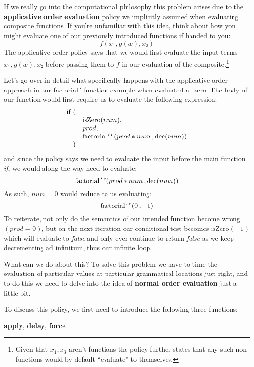 \documentclass[twoside]{article}
\newcommand{\supst}[1]{\ensuremath{^{\mbox{\scriptsize #1}}}}
\newcommand{\strong}[1]{{\bfseries #1}}
\begin{document}
If we really go into the computational philosophy this problem arises due to the \strong{applicative order evaluation}
policy we implicitly assumed when evaluating composite functions. If you're unfamiliar with this idea, think
about how you might evaluate one of our previously introduced functions if handed to you:
$$ f(x_1,g(w),x_3) $$
The applicative order policy says that we would first evaluate the input terms $ x_1, g(w), x_3 $ before passing
them to $ f $ in our evaluation of the composite.\footnote{Given that $ x_1, x_3 $ aren't functions the policy further
states that any such non-functions would by default ``evaluate'' to themselves.}

Let's go over in detail what specifically happens with the applicative order approach in our factorial$\,'$ function example
when evaluated at zero. The body of our function would first require us to evaluate the following expression:
$$ \begin{array}{rl}
\mbox{if}\ (										\\
		& \mbox{isZero}(num),							\\
		& prod,									\\
		& \mbox{factorial}\,'\,\supst{e}(prod*num\,, \mbox{dec}(num))		\\
)											\\
\end{array} $$
and since the policy says we need to evaluate the input before the main function \emph{if},
we would along the way need to evaluate:
$$ \mbox{factorial}\,'\,\supst{e}(prod*num\,, \mbox{dec}(num)) $$
As such, $ num = 0 $ would reduce to us evaluating:
$$ \mbox{factorial}\,'\,\supst{e}(0\,, -1) $$
To reiterate, not only do the semantics of our intended function become wrong $(prod = 0)$, but on the next iteration
our conditional test becomes $ \mbox{isZero}(-1) $ which will evaluate to \emph{false} and only ever continue
to return \emph{false} as we keep decrementing ad infinitum, thus our infinite loop.

What can we do about this? To solve this problem we have to time the evaluation of particular values at particular
grammatical locations just right, and to do this we need to delve into the idea of \strong{normal order evaluation}
just a little bit.

To discuss this policy, we first need to introduce the following three functions:

\begin{center}
\strong{apply}, \strong{delay}, \strong{force}
\end{center}
\end{document}
